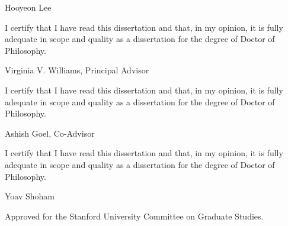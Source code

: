 \thispagestyle{empty}
\begin{flushright}
Hooyeon Lee
\end{flushright}

\vspace{5em}

I certify that I have read this dissertation and that, in my opinion, it is fully adequate in scope and quality as a dissertation for the degree of Doctor of Philosophy.


\begin{flushright}
\vspace{2em}
\underline{\hspace{6cm}}

Virginia V. Williams, Principal Advisor
\end{flushright}

\vspace{5em}

I certify that I have read this dissertation and that, in my opinion, it is fully adequate in scope and quality as a dissertation for the degree of Doctor of Philosophy.


\begin{flushright}
\vspace{2em}
\underline{\hspace{6cm}}

Ashish Goel, Co-Advisor
\end{flushright}

\vspace{5em}

I certify that I have read this dissertation and that, in my opinion, it is fully adequate in scope and quality as a dissertation for the degree of Doctor of Philosophy.

\begin{flushright}
\vspace{2em}
\underline{\hspace{6cm}}

Yoav Shoham
\end{flushright}


\vspace{5em}

Approved for the Stanford University Committee on Graduate Studies.

\begin{flushright}
\vspace{2em}
\underline{\hspace{6cm}}
\end{flushright}

\restoregeometry